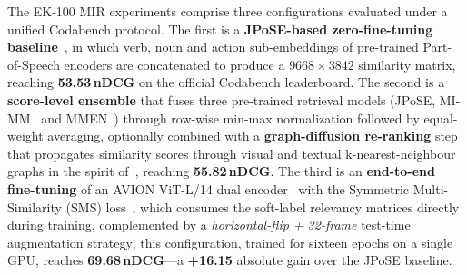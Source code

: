 The EK-100 MIR experiments comprise three configurations evaluated under a unified Codabench protocol. The first is a \textbf{JPoSE-based zero-fine-tuning baseline}~\cite{wray2019jpose}, in which verb, noun and action sub-embeddings of pre-trained Part-of-Speech encoders are concatenated to produce a $9668\times 3842$ similarity matrix, reaching \textbf{53.53\,nDCG} on the official Codabench leaderboard. The second is a \textbf{score-level ensemble} that fuses three pre-trained retrieval models (JPoSE, MI-MM~\cite{miech2020milnce} and MMEN~\cite{wray2019jpose}) through row-wise min-max normalization followed by equal-weight averaging, optionally combined with a \textbf{graph-diffusion re-ranking} step that propagates similarity scores through visual and textual k-nearest-neighbour graphs in the spirit of~\cite{iscen2017diffusion}, reaching \textbf{55.82\,nDCG}. The third is an \textbf{end-to-end fine-tuning} of an AVION ViT-L/14 dual encoder~\cite{zhao2023avion} with the Symmetric Multi-Similarity (SMS) loss~\cite{wang2024symmetricmultisimilaritylossepickitchens100}, which consumes the soft-label relevancy matrices directly during training, complemented by a \emph{horizontal-flip + 32-frame} test-time augmentation strategy; this configuration, trained for sixteen epochs on a single GPU, reaches \textbf{69.68\,nDCG}---a \textbf{+16.15} absolute gain over the JPoSE baseline.
